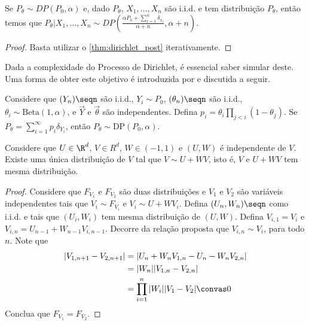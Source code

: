 \begin{theorem}
 \label{thm:dirichlet_post_n}
 Se $P_{\theta} \sim DP(P_0, \alpha)$ e,
 dado $P_{\theta}$, $X_1,\ldots,X_n$ são
 i.i.d. e tem distribuição $P_{\theta}$, então
 temos que $P_{\theta}|X_1,\ldots,X_n
 \sim DP\left(
 \frac{\alpha P_0 + \sum_{i=1}^n \delta_{x_i}}
 {\alpha+n}, \alpha+n\right)$.
\end{theorem}

\begin{proof}
 Basta utilizar o 
 \cref{thm:dirichlet_post}
 iterativamente.
\end{proof}

Dada a complexidade do Processo de Dirichlet,
é essencial saber simular deste.
Uma forma de obter este objetivo é
introduzida por \citet{Sethuraman1994} e
discutida a seguir.

\begin{theorem}
 \label{thm:dp-stick}
 Considere que $(Y_{n})\seqn$ são
 i.i.d., $Y_i \sim P_0$,
 $(\theta_n)\seqn$ são i.i.d.,
 $\theta_i \sim \text{Beta}(1,\alpha)$, 
 e $\vec{Y}$ e $\vec{\theta}$ são
 independentes. Defina
 $p_i = \theta_i\prod_{j < i}(1-\theta_j)$.
 Se $P_{\theta} = \sum_{i=1}^{\infty}p_i \delta_{Y_i}$,
 então $P_{\theta} \sim \text{DP}(P_0, \alpha)$.
\end{theorem}

\begin{lemma}
 Considere que $U \in \R^d$, $V \in R^d$,
 $W \in (-1,1)$ e $(U,W)$ é independente de $V$.
 Existe uma única distribuição de $V$ tal que
 $V \sim U + WV$, isto é,
 $V$ e $U + WV$ tem mesma distribuição.
\end{lemma}

\begin{proof}
 Considere que $F_{V_1}$ e $F_{V_2}$ são
 duas distribuições e $V_1$ e $V_2$ são
 variáveis independentes tais que
 $V_i \sim F_{V_i}$ e
 $V_i \sim U + WV_i$.
 Defina $(U_n,W_n)\seqn$ como i.i.d.
 e tais que $(U_i,W_i)$ tem
 mesma distribuição de $(U,W)$.
 Defina $V_{i,1} = V_i$ e
 $V_{i,n} = U_{n-1} + W_{n-1} V_{i,n-1}$.
 Decorre da relação proposta que
 $V_{i,n} \sim V_i$, para todo $n$. Note que
 \begin{align*}
  |V_{1,n+1}-V_{2,n+1}| 
  &= |U_{n}+W_{n}V_{1,n}
  -U_{n}-W_{n}V_{2,n}| \\
  &= |W_{n}||V_{1,n}-V_{2,n}| \\
  &= \prod_{i=1}^{n}|W_i||V_1-V_2|
  \convas 0
 \end{align*}
 Conclua que $F_{V_1} = F_{V_2}$.
\end{proof}

